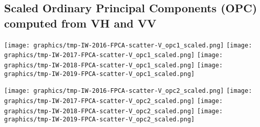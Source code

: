 \subsection{Scaled Ordinary Principal Components (OPC) computed from VH and VV}
\label{FPCA-scatter-opc-scaled}

\begin{center}
\begin{minipage}{7.0in}
\texttt{[image: graphics/tmp-IW-2016-FPCA-scatter-V\_opc1\_scaled.png]}
\quad
\texttt{[image: graphics/tmp-IW-2017-FPCA-scatter-V\_opc1\_scaled.png]}
\vskip 1.0cm
\texttt{[image: graphics/tmp-IW-2018-FPCA-scatter-V\_opc1\_scaled.png]}
\quad
\texttt{[image: graphics/tmp-IW-2019-FPCA-scatter-V\_opc1\_scaled.png]}
\end{minipage}
\end{center}


\clearpage
\begin{center}
\begin{minipage}{7.0in}
\texttt{[image: graphics/tmp-IW-2016-FPCA-scatter-V\_opc2\_scaled.png]}
\quad
\texttt{[image: graphics/tmp-IW-2017-FPCA-scatter-V\_opc2\_scaled.png]}
\vskip 1.0cm
\texttt{[image: graphics/tmp-IW-2018-FPCA-scatter-V\_opc2\_scaled.png]}
\quad
\texttt{[image: graphics/tmp-IW-2019-FPCA-scatter-V\_opc2\_scaled.png]}
\end{minipage}
\end{center}


\renewcommand{\theenumi}{\roman{enumi}}
\renewcommand{\labelenumi}{\textnormal{(\theenumi)}$\;\;$}

